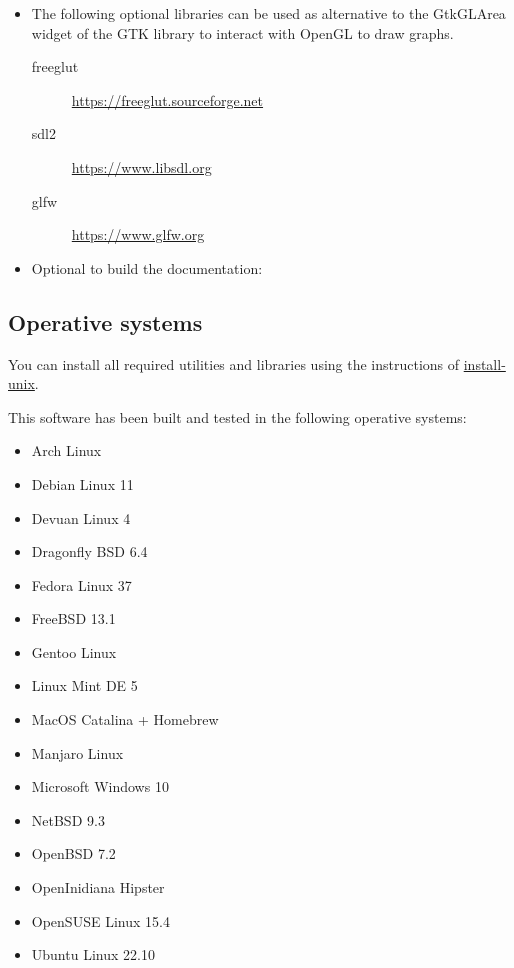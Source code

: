 \begin{itemize}
\item The following optional libraries can be used as alternative to the
GtkGLArea widget of the GTK library to interact with OpenGL to draw graphs.
\begin{description}
\item[freeglut]\url{https://freeglut.sourceforge.net}
\item[sdl2]\url{https://www.libsdl.org}
\item[glfw]\url{https://www.glfw.org}
\end{description}

\item Optional to build the documentation:

\end{itemize}

\subsection{Operative systems}

You can install all required utilities and libraries using the instructions of
\href{https://github.com/jburguete/install-unix}{install-unix}.

This software has been built and tested in the following operative systems:
\begin{itemize}
\item Arch Linux
\item Debian Linux 11
\item Devuan Linux 4
\item Dragonfly BSD 6.4
\item Fedora Linux 37
\item FreeBSD 13.1
\item Gentoo Linux
\item Linux Mint DE 5
\item MacOS Catalina + Homebrew
\item Manjaro Linux
\item Microsoft Windows 10
\item NetBSD 9.3
\item OpenBSD 7.2
\item OpenInidiana Hipster
\item OpenSUSE Linux 15.4
\item Ubuntu Linux 22.10
\end{itemize}

